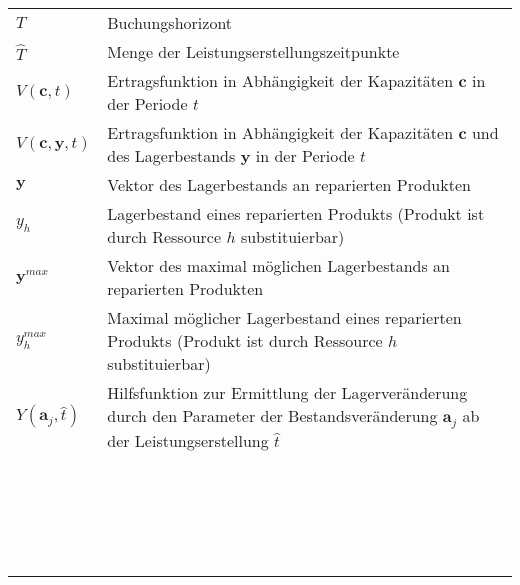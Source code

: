 \documentclass[a4paper,12pt,normalheadings,footexclude,headinclude,liststotoc,nochapterprefix,onecolumn,oneside,parskip,pointlessnumbers]{scrreprt}
\begin{document}
\begin{table}[t!]
    \vspace*{-3mm}
    \hspace*{2mm}
  \renewcommand{\arraystretch}{1,5}
  \begin{flushleft}
    \begin{tabular}{lp{11.5cm}}  %
                $T$ & Buchungshorizont\\
        $\hat T$ & Menge der Leistungserstellungszeitpunkte\\
   $V(\textbf{c},t)$ & Ertragsfunktion in Abhängigkeit der Kapazitäten $\textbf{c}$ in der Periode $t$\\
      $V(\textbf{c},\textbf{y},t)$ & Ertragsfunktion in Abhängigkeit der Kapazitäten $\textbf{c}$ und des Lagerbestands $\textbf{y}$ in der Periode $t$\\
            $\textbf{y}$ & Vektor des Lagerbestands an reparierten Produkten\\
      $y_h$ & Lagerbestand eines reparierten Produkts (Produkt ist durch Ressource $h$ substituierbar) \\
        $\textbf{y}^{max}$ & Vektor des maximal möglichen Lagerbestands an reparierten Produkten \\
            $y^{max}_h$ & Maximal möglicher Lagerbestand eines reparierten Produkts (Produkt ist durch Ressource $h$ substituierbar) \\
                      $Y(\textbf{a}_{j},\hat t)$ & Hilfsfunktion zur Ermittlung der Lagerveränderung durch den Parameter der Bestandsveränderung $\textbf{a}_{j}$ ab der Leistungserstellung $\hat t$\\
                                  \\
            \\
            \\
            \\
            \\
            \\
                                              \\
            \\
            \\
            \\
            \\
            \\
                        \\
            \\
                                              \\
            \\
            \\
            \\
            \\
            \\
	\end{tabular}
	\end{flushleft}
\end{table}
\end{document}
